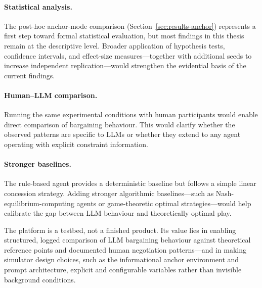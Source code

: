 \paragraph{Statistical analysis.}
The post-hoc anchor-mode comparison (Section~\ref{sec:results-anchor}) represents a first step toward formal statistical evaluation, but most findings in this thesis remain at the descriptive level.  Broader application of hypothesis tests, confidence intervals, and effect-size measures---together with additional seeds to increase independent replication---would strengthen the evidential basis of the current findings.

\paragraph{Human--LLM comparison.}
Running the same experimental conditions with human participants would enable direct comparison of bargaining behaviour.  This would clarify whether the observed patterns are specific to LLMs or whether they extend to any agent operating with explicit constraint information.

\paragraph{Stronger baselines.}
The rule-based agent provides a deterministic baseline but follows a simple linear concession strategy.  Adding stronger algorithmic baselines---such as Nash-equilibrium-computing agents or game-theoretic optimal strategies---would help calibrate the gap between LLM behaviour and theoretically optimal play.

\vspace{1em}

The platform is a testbed, not a finished product.  Its value lies in enabling structured, logged comparison of LLM bargaining behaviour against theoretical reference points and documented human negotiation patterns---and in making simulator design choices, such as the informational anchor environment and prompt architecture, explicit and configurable variables rather than invisible background conditions.
